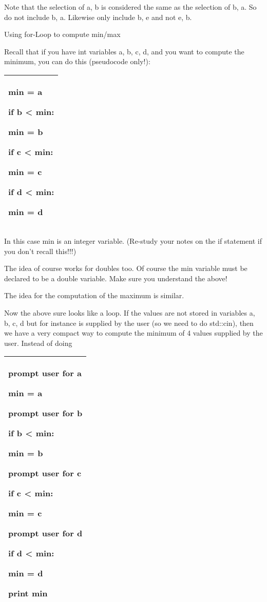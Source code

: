 \documentclass[
]{article}
\begin{document}
Note that the selection of a, b is considered the same as the selection
of b, a. So do not include b, a. Likewise only include b, e and not e,
b.

Using for-Loop to compute min/max

Recall that if you have int variables a, b, c, d, and you want to
compute the minimum, you can do this (pseudocode only!):

\begin{longtable}[]{@{}l@{}}
\toprule
\endhead
\begin{minipage}[t]{0.97\columnwidth}\raggedright
min = a

if b \textless{} min:

min = b

if c \textless{} min:

min = c

if d \textless{} min:

min = d\strut
\end{minipage}\tabularnewline
\bottomrule
\end{longtable}

In this case min is an integer variable. (Re-study your notes on the if
statement if you don't recall this!!!)

The idea of course works for doubles too. Of course the min variable
must be declared to be a double variable. Make sure you understand the
above!

The idea for the computation of the maximum is similar.

Now the above sure looks like a loop. If the values are not stored in
variables a, b, c, d but for instance is supplied by the user (so we
need to do std::cin), then we have a very compact way to compute the
minimum of 4 values supplied by the user. Instead of doing

\begin{longtable}[]{@{}l@{}}
\toprule
\endhead
\begin{minipage}[t]{0.97\columnwidth}\raggedright
prompt user for a

min = a

prompt user for b

if b \textless{} min:

min = b

prompt user for c

if c \textless{} min:

min = c

prompt user for d

if d \textless{} min:

min = d

print min\strut
\end{minipage}\tabularnewline
\bottomrule
\end{longtable}
\end{document}
